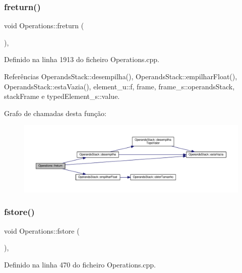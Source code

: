 \subsubsection{\texorpdfstring{freturn()}{freturn()}}
{\footnotesize\ttfamily void Operations\+::freturn (\begin{DoxyParamCaption}{ }\end{DoxyParamCaption})\hspace{0.3cm}{\ttfamily [static]}, {\ttfamily [private]}}



Definido na linha 1913 do ficheiro Operations.\+cpp.



Referências Operands\+Stack\+::desempilha(), Operands\+Stack\+::empilhar\+Float(), Operands\+Stack\+::esta\+Vazia(), element\+\_\+u\+::f, frame, frame\+\_\+s\+::operands\+Stack, stack\+Frame e typed\+Element\+\_\+s\+::value.

Grafo de chamadas desta função\+:\nopagebreak
\begin{figure}[H]
\begin{center}
\leavevmode
\includegraphics[width=350pt]{classOperations_a701431fe6d5d20fafa747dbeae90e1d4_cgraph}
\end{center}
\end{figure}
\mbox{\label{classOperations_a42a0b3220b593059320cf7d5a5eed6e2}} 
\subsubsection{\texorpdfstring{fstore()}{fstore()}}
{\footnotesize\ttfamily void Operations\+::fstore (\begin{DoxyParamCaption}{ }\end{DoxyParamCaption})\hspace{0.3cm}{\ttfamily [static]}, {\ttfamily [private]}}



Definido na linha 470 do ficheiro Operations.\+cpp.



